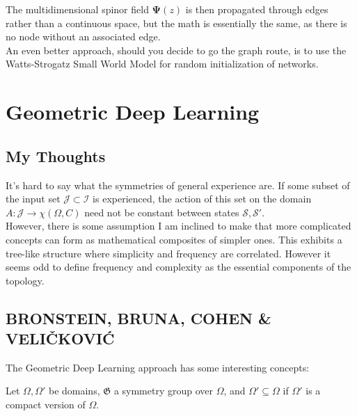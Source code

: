 \documentclass{article}
\begin{document}
The multidimensional spinor field $\mathbf{\Psi}(z)$ is then propagated through edges rather than a continuous space, but the math is essentially the same, as there is no node without an associated edge. \\

An even better approach, should you decide to go the graph route, is to use the Watts-Strogatz Small World Model for random initialization of networks.

\section{Geometric Deep Learning}
\subsection{My Thoughts}
It's hard to say what the symmetries of general experience are. If some subset of the input set $\mathcal{J} \subset \mathcal{I}$ is experienced, the action of this set on the domain $A: \mathcal{J} \to \chi(\Omega, C)$ need not be constant between states $\mathcal{S}, \mathcal{S}'$. \\

However, there is some assumption I am inclined to make that more complicated concepts can form as mathematical composites of simpler ones. This exhibits a tree-like structure where simplicity and frequency are correlated. However it seems odd to define frequency and complexity as the essential components of the topology.

\subsection{BRONSTEIN, BRUNA, COHEN \& VELIČKOVIĆ}
The Geometric Deep Learning approach has some interesting concepts:

Let $\Omega, \Omega'$ be domains, $\mathfrak{G}$ a symmetry group over $\Omega$, and $\Omega' \subseteq \Omega$ if $\Omega'$ is a compact version of $\Omega$.
\end{document}
